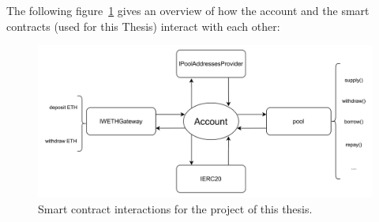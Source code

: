 \documentclass[11pt,a4paper]{report}
\begin{document}
The following figure~\ref{fig:interactionSC} gives an overview of how the account and the  smart contracts (used for this Thesis) interact with each other:
\begin{figure}[htp]
	\centering
	\includegraphics[width=\textwidth]{./images/interactionSC}
	\caption{Smart contract interactions for the project of this thesis.}
	\label{fig:interactionSC}
\end{figure}
\end{document}
